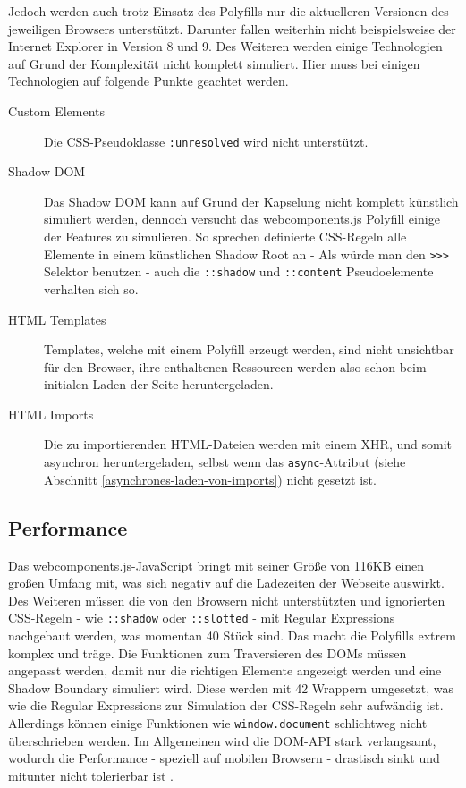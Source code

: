 Jedoch werden auch trotz Einsatz des Polyfills nur die aktuelleren Versionen des jeweiligen Browsers unterstützt. Darunter fallen weiterhin nicht beispielsweise der Internet Explorer in Version 8 und 9. Des Weiteren werden einige Technologien auf Grund der Komplexität nicht komplett simuliert. Hier muss bei einigen Technologien auf folgende Punkte geachtet werden.



\begin{description}
  \item[Custom Elements] Die \ac{CSS}-Pseudoklasse \texttt{:unresolved} wird nicht unterstützt.
  \item[Shadow \ac{DOM}] Das Shadow \ac{DOM} kann auf Grund der Kapselung nicht komplett künstlich simuliert werden, dennoch versucht das webcomponents.js Polyfill einige der Features zu simulieren. So sprechen definierte \ac{CSS}-Regeln alle Elemente in einem künstlichen Shadow Root an - Als würde man den \texttt{\textgreater{}\textgreater{}\textgreater{}} Selektor benutzen - auch die \texttt{::shadow} und \texttt{::content} Pseudoelemente verhalten sich so.
  \item[\ac{HTML} Templates] Templates, welche mit einem Polyfill erzeugt werden, sind nicht unsichtbar für den Browser, ihre enthaltenen Ressourcen werden also schon beim initialen Laden der Seite heruntergeladen.
  \item[\ac{HTML} Imports] Die zu importierenden \ac{HTML}-Dateien werden mit einem \ac{XHR}, und somit asynchron heruntergeladen, selbst wenn das \texttt{async}-Attribut (siehe Abschnitt \ref{asynchrones-laden-von-imports}) nicht gesetzt ist.
\end{description}


\subsection{Performance}\label{performance}

Das webcomponents.js-JavaScript \cite{citeulike:13914238} bringt mit seiner Größe von 116KB einen großen Umfang mit, was sich negativ auf die Ladezeiten der Webseite auswirkt. Des Weiteren müssen die von den Browsern nicht unterstützten und ignorierten \ac{CSS}-Regeln - wie \texttt{::shadow} oder \texttt{::slotted} - mit Regular Expressions nachgebaut werden, was momentan 40 Stück sind. Das macht die Polyfills extrem komplex und träge. Die Funktionen zum Traversieren des \ac{DOM}s müssen angepasst werden, damit nur die richtigen Elemente angezeigt werden und eine Shadow Boundary simuliert wird. Diese werden mit 42 Wrappern umgesetzt, was wie die Regular Expressions zur Simulation der \ac{CSS}-Regeln sehr aufwändig ist. Allerdings können einige Funktionen wie \texttt{window.document} schlichtweg nicht überschrieben werden. Im Allgemeinen wird die \ac{DOM}-\ac{API} stark verlangsamt, wodurch die Performance - speziell auf mobilen Browsern - drastisch sinkt und mitunter nicht tolerierbar ist \cite{citeulike:13886251}.
